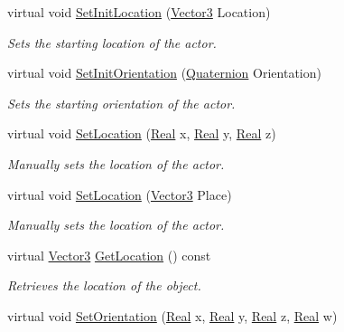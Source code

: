 \begin{DoxyCompactItemize}
virtual void \hyperlink{classphys_1_1ActorSoft_abbb6f5cce15d4efee91acd4825c75801}{SetInitLocation} (\hyperlink{classphys_1_1Vector3}{Vector3} Location)
\begin{DoxyCompactList}\small\item\em Sets the starting location of the actor. \item\end{DoxyCompactList}\item 
virtual void \hyperlink{classphys_1_1ActorSoft_adde8ecfb7188b8cbb238e88da18ac95e}{SetInitOrientation} (\hyperlink{classphys_1_1Quaternion}{Quaternion} Orientation)
\begin{DoxyCompactList}\small\item\em Sets the starting orientation of the actor. \item\end{DoxyCompactList}\item 
virtual void \hyperlink{classphys_1_1ActorSoft_a30ca5d4db06d9a81b5aff23faed4ee8d}{SetLocation} (\hyperlink{namespacephys_af7eb897198d265b8e868f45240230d5f}{Real} x, \hyperlink{namespacephys_af7eb897198d265b8e868f45240230d5f}{Real} y, \hyperlink{namespacephys_af7eb897198d265b8e868f45240230d5f}{Real} z)
\begin{DoxyCompactList}\small\item\em Manually sets the location of the actor. \item\end{DoxyCompactList}\item 
virtual void \hyperlink{classphys_1_1ActorSoft_a35020af183a31e288ff226a34fd1a0ab}{SetLocation} (\hyperlink{classphys_1_1Vector3}{Vector3} Place)
\begin{DoxyCompactList}\small\item\em Manually sets the location of the actor. \item\end{DoxyCompactList}\item 
virtual \hyperlink{classphys_1_1Vector3}{Vector3} \hyperlink{classphys_1_1ActorSoft_afdbd6ae49e3838190e5481796e650ce8}{GetLocation} () const 
\begin{DoxyCompactList}\small\item\em Retrieves the location of the object. \item\end{DoxyCompactList}\item 
virtual void \hyperlink{classphys_1_1ActorSoft_a84541e8ebf7b54c91d2353d5f84381bb}{SetOrientation} (\hyperlink{namespacephys_af7eb897198d265b8e868f45240230d5f}{Real} x, \hyperlink{namespacephys_af7eb897198d265b8e868f45240230d5f}{Real} y, \hyperlink{namespacephys_af7eb897198d265b8e868f45240230d5f}{Real} z, \hyperlink{namespacephys_af7eb897198d265b8e868f45240230d5f}{Real} w)

\end{DoxyCompactItemize}
